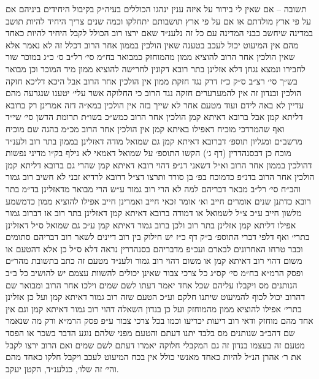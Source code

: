 \documentclass[12pt, openany]{book}
\begin{document}
\begin{multicols}{2}
תשובה – אם שאין לי בירור על איזה ענין ינהגו הכוללים בעיה״ק בקיבול היחידים ביניהם אם על פי ארץ מולדתם או אם על פי ארץ תושבותם יתחלקו וכמה שנים צריך היחיד להיות תושב במדינה שיחשב כבני המדינה עם כל זה נלענ״ד שאם ירצו רוב הכולל לקבל היחיד להיות כאחד מהם אין המיעוט יכול לעכב בטענה שאין הולכין בממון אחר הרוב דכלל זה לא נאמר אלא שאין הולכין אחר הרוב להוציא ממון מהמוחזק כמבואר בח״מ סי׳ רל״ב ס׳ כ״ג במוכר שור לחבירו ונמצא נגחן דלא אזלינן בתר רובא דקונין לחרישה להוציא ממון מיד המוכר וכן מבואר בש״ך סי׳ רצ״ב ס״ק כ״ז דרק נגד חזקת ממון אין הולכין אחר הרוב אבל היכא דליכא חזקה הולכין ובנדון זה אין להמערערים חזקה נגד הרוב כי החלוקה אשר עלי׳ יטענו שנגרעה מהם עדיין לא באה לידם ועוד מטעם אחר לא שייך בזה אין הולכין במא״ה דזה אמרינן רק ברובא דליתא קמן אבל ברובא דאיתא קמן הולכין אחר הרוב כמש״כ בשו״ת תרומת הדשן סי׳ שי״ד ואף שהמרדכי מוכיח דאפילו באיתא קמן אין הולכין אחר הרוב מכ״מ בהגה שם מוכיח מרשב״ם ומגליון תוספ׳ דברובא דאיתא קמן גם שמואל מודה דאזלינן בממון בתר רוב ולענ״ד מוכח כן דבסנהדרין (דף ג׳) הקשו התוספ׳ על שמואל דאמאי לא נילף בק״ו מדיני נפשות דהולכין בממון אחר הרוב וא״ל דשאני דנ״פ דהוי רובא דאיתא קמן שהרי גם ברובא דליתא קמן הולכין אחר הרוב בדנ״פ כדמוכח בפ׳ בן סורר ותרצו דצ״ל דרובא לרדיא זבני לא חשיב רוב גמור והב״ח סי׳ רל״ב מבאר דבריהם למה לא הרי רוב גמור ע״ש הרי מבואר מדאזלינן בד״מ בתר רובא כדתנן שנים אומרים חייב וא׳ אומר זכאי חייב ואמרינן חייב אפילו להוציא ממון כדמשמע מלשון חייב ע״כ צ״ל לשמואל או דמודה ברובא דאיתא קמן דאזלינן בתר רוב או דברוב גמור אפילו דליתא קמן אזלינן בתר רוב ולכן ברוב גמור דאיתא קמן ע״כ גם שמואל ס״ל דאזלינן בתרי׳ ואף דלפי דברי התוספ׳ ב״ק דף כ״ז יש חילוק בין רוב דיינים לשאר רוב דבריהם סתומים וכבר טרחו האחרונים לבארם ועכ״פ מדבריהם בסנהדרין נראה דלא ס״ל כן אלא דהטעם או משום דהוי רוב דאיתא קמן או משום דהוי רוב גמור ולענ״ד מטעם זה כתב בתשובת מהר״ם ופסק הרמ״א בח״מ סי׳ קס״ג כל צרכי צבור שאינן יכולים להשוות עצמם יש להושיב כל ב״ב הנותנים מס ויקבלו עליהם שכל אחד יאמר דעתו לשם שמים וילכו אחר הרוב ומבואר שם דהרוב יכול לכוף להמיעוט שיתנו חלקם וע״כ הטעם שזה רוב גמור דאיתא קמן ועל כן אזלינן בתרי׳ אפילו להוציא ממון מהמוחזק ועל כן בנדון השאלה דהוי רוב גמור דאיתא קמן וגם אין אחד מהם מוחזק ודאי רוב דיעות יכריעו וכמו בכל צרכי צבור ע״פ פסק הרמ״א ורק מה שנאמר שם דהב״ב שנותנים מס בלבד יתנו דעתם והטעם מפני שלהם נוגע הדבר בשכר או הפסד מטעם זה בעצמו בנדון זה גם המקבלי חלוקה יאמרו דעתם לשם שמים ואם הרוב ירצו לקבל את ר׳ אהרן הנ״ל להיות כאחד מאנשי כולל אין בכח המיעוט לעכב ויקבל חלקו כאחד מהם והי׳ זה שלו׳, כנלענ״ד, הקטן יעקב.\\\vspace{0pt}

\end{multicols}\newpage
\end{document}
